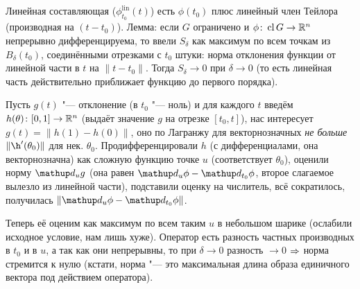 \section{} %
Линейная составляющая ($\phi^{\mathup{lin}}_{t_0} (t)$) есть $\phi(t_0)$ плюс линейный член Тейлора (производная на $(t-t_0)$).
Лемма: если $G$ ограничено и $\phi \colon \operatorname{cl} G \to \mathbb{R}^n$ непрерывно дифференцируема, то ввели $S_\delta$ как максимум
по всем точкам из $B_\delta(t_0)$, соединёнными отрезками с $t_0$ штуки: норма отклонения функции от линейной части в $t$ на $\|t-t_0\|$.
Тогда $S_\delta \to 0$ при $\delta \to 0$ (то есть линейная часть действительно приближает функцию до первого порядка).

Пусть $g(t)$ "--- отклонение (в $t_0$ "--- ноль) и для каждого $t$ введём $h(\theta) \colon [0,1] \to \mathbb{R}^n$ (выдаёт значение $g$ на отрезке $[t_0, t]$),
нас интересует $g(t)=\|h(1)-h(0)\|$, оно по Лагранжу для векторнозначных \textit{не больше} $\|\h'(\theta_0)\|$ для нек. $\theta_0$.
Продифференцировали $h$ (с дифференциалами, она векторнозначна) как сложную функцию точке $u$ (соответствует $\theta_0$), оценили норму $\d_u g$
(она равен $\d_u \phi - \d_{t_0} \phi$, второе слагаемое вылезло из линейной части), подставили оценку на числитель, всё сократилось, получилась $\|\d_u \phi - \d_{t_0} \phi\|$.

Теперь её оценим как максимум по всем таким $u$ в небольшом шарике (ослабили исходное условие, нам лишь хуже).
Оператор есть разность частных производных в $t_0$ и в $u$, а так как они непрерывны, то при $\delta\to0$ разность $\to 0$ $\Rightarrow$ норма стремится к нулю
(кстати, норма "--- это максимальная длина образа единичного вектора под действием оператора).

\section{} %
\TODO

\section{} %
\TODO

\section{} %
\TODO

\section{} %
\TODO

\section{} %
\TODO
